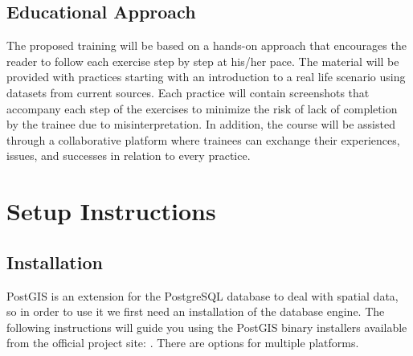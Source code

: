 \documentclass[a4paper,11pt,english]{sphinxmanual}
\begin{document}
\section{Educational Approach}
\label{\detokenize{instructions:educational-approach}}
The proposed training will be based on a hands-on approach that encourages the reader to follow each exercise step by step at his/her pace. The material will be provided with practices starting with an introduction to a real life scenario using datasets from current sources.
Each practice will contain screenshots that accompany each step of the exercises to minimize the risk of lack of completion by the trainee due to misinterpretation. In addition, the course will be assisted through a collaborative platform where trainees can exchange their experiences, issues, and successes in relation to every practice.


\chapter{Setup Instructions}
\label{\detokenize{setup:setup-instructions}}\label{\detokenize{setup::doc}}

\section{Installation}
\label{\detokenize{setup:installation}}\label{\detokenize{setup:id1}}
PostGIS is an extension for the PostgreSQL database to deal with spatial data, so in order to use it we first need an installation of the database engine. The following instructions will guide you using the PostGIS binary installers available from the official project site: . There are options for multiple platforms.
\end{document}
